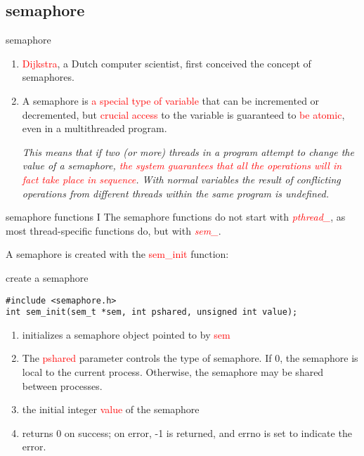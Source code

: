 \documentclass{beamer}
\begin{document}
\subsection{semaphore}
\begin{frame}{semaphore}
\begin{enumerate}
\item
\textcolor{red}{Dijkstra}, a Dutch computer scientist, first conceived the concept of semaphores. 
\item
A semaphore is \textcolor{red}{a special type of variable} that can be incremented or decremented, but \textcolor{red}{crucial access} to the variable is guaranteed to \textcolor{red}{be atomic}, even in a multithreaded program. 

\emph{This means that if two (or more) threads in a program attempt to change the value of a semaphore, \textcolor{red}{the system guarantees that all the operations will in fact take place in sequence}. With normal variables the result of conflicting operations from different threads within the same program is undefined.}
\end{enumerate}
\end{frame}
\begin{frame}[fragile]{semaphore functions I}
The semaphore functions do not start with \textcolor{red}{\emph{pthread\_}}, as most thread-specific functions do, but with \textcolor{red}{\emph{sem\_}}.

A semaphore is created with the \textcolor{red}{sem\_init} function:
\begin{block}{create a semaphore}
\begin{verbatim}
#include <semaphore.h>
int sem_init(sem_t *sem, int pshared, unsigned int value);
\end{verbatim}
\end{block}
\begin{enumerate}
\item
initializes a semaphore object pointed to by \textcolor{red}{sem}
\item
The \textcolor{red}{pshared} parameter controls the type of semaphore. If 0, the semaphore is local to the current process. Otherwise, the semaphore may be shared between processes. 
\item
the initial integer \textcolor{red}{value} of the semaphore
\item
returns 0 on success; on error, -1 is returned, and errno is set to indicate the error.
\end{enumerate}

\end{frame}
\end{document}
